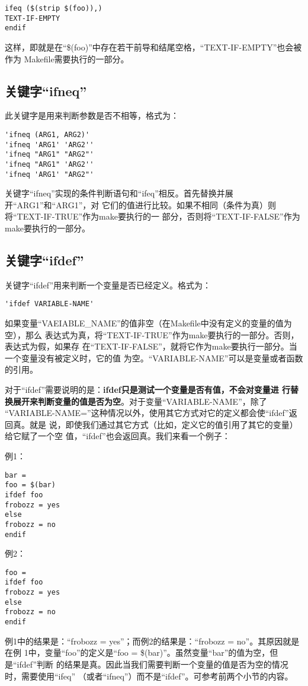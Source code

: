 \begin{Verbatim}[]
ifeq ($(strip $(foo)),)
TEXT-IF-EMPTY
endif
\end{Verbatim}
这样，即就是在“\$(foo)”中存在若干前导和结尾空格，“TEXT-IF-EMPTY”也会被作为
Makefile需要执行的一部分。

\subsection{关键字“ifneq”}
此关键字是用来判断参数是否不相等，格式为：
\begin{Verbatim}[]
'ifneq (ARG1, ARG2)'
'ifneq 'ARG1' 'ARG2''
'ifneq "ARG1" "ARG2"'
'ifneq "ARG1" 'ARG2''
'ifneq 'ARG1' "ARG2"'
\end{Verbatim}
关键字“ifneq”实现的条件判断语句和“ifeq”相反。首先替换并展开“ARG1”和“ARG1”，对
它们的值进行比较。如果不相同（条件为真）则将“TEXT-IF-TRUE”作为make要执行的一
部分，否则将“TEXT-IF-FALSE”作为make要执行的一部分。

\subsection{关键字“ifdef”}
关键字“ifdef”用来判断一个变量是否已经定义。格式为：
\begin{Verbatim}[]
'ifdef VARIABLE-NAME'
\end{Verbatim}

如果变量“VAEIABLE\_NAME”的值非空（在Makefile中没有定义的变量的值为空），那么
表达式为真，将“TEXT-IF-TRUE”作为make要执行的一部分。否则，表达式为假，如果存
在“TEXT-IF-FALSE”，就将它作为make要执行一部分。当一个变量没有被定义时，它的值
为空。“VARIABLE-NAME”可以是变量或者函数的引用。

对于“ifdef”需要说明的是：\textbf{ifdef只是测试一个变量是否有值，不会对变量进
行替换展开来判断变量的值是否为空}。对于变量“VARIABLE-NAME”，除了
“VARIABLE-NAME=”这种情况以外，使用其它方式对它的定义都会使“ifdef”返回真。就是
说，即使我们通过其它方式（比如，定义它的值引用了其它的变量）给它赋了一个空
值，“ifdef”也会返回真。我们来看一个例子：

例1：
\begin{Verbatim}[]
bar =
foo = $(bar)
ifdef foo
frobozz = yes
else
frobozz = no
endif
\end{Verbatim}

例2：
\begin{Verbatim}[]
foo =
ifdef foo
frobozz = yes
else
frobozz = no
endif
\end{Verbatim}

例1中的结果是：“frobozz = yes”；而例2的结果是：“frobozz = no”。其原因就是在例
1中，变量“foo”的定义是“foo = \$(bar)”。虽然变量“bar”的值为空，但是“ifdef”判断
的结果是真。因此当我们需要判断一个变量的值是否为空的情况时，需要使用“ifeq”
（或者“ifneq”）而不是“ifdef”。可参考前两个小节的内容。

